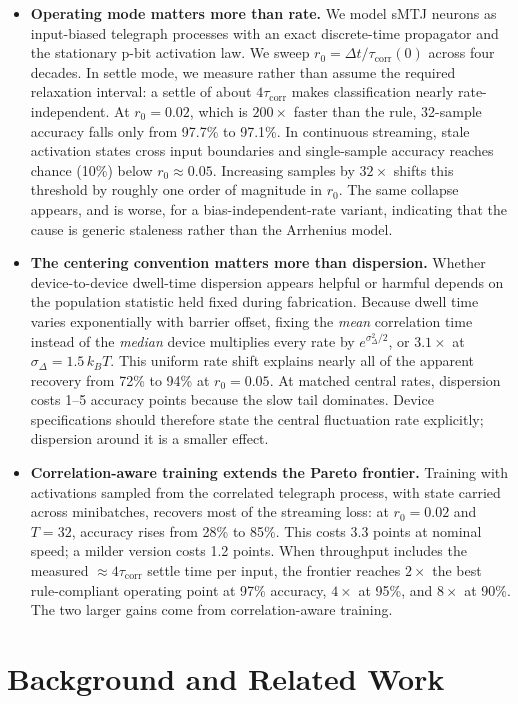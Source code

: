 \documentclass[journal]{IEEEtran}
\newcommand{\rzero}{r_0}
\newcommand{\tauc}{\tau_{\mathrm{corr}}}
\begin{document}
\begin{itemize}
\item \textbf{Operating mode matters more than rate.} We model sMTJ
neurons as input-biased telegraph processes with an exact discrete-time
propagator and the stationary p-bit activation law. We sweep
$\rzero=\Delta t/\tauc(0)$ across four decades. In settle mode, we measure
rather than assume the required relaxation interval: a settle of about
$4\tauc$ makes classification nearly rate-independent. At $\rzero=0.02$,
which is $200\times$ faster than the rule, 32-sample accuracy falls only
from 97.7\% to 97.1\%. In continuous streaming, stale activation states
cross input boundaries and single-sample accuracy reaches chance (10\%)
below $\rzero\approx0.05$. Increasing samples by $32\times$ shifts this
threshold by roughly one order of magnitude in $\rzero$. The same collapse
appears, and is worse, for a bias-independent-rate variant, indicating that
the cause is generic staleness rather than the Arrhenius model.
\item \textbf{The centering convention matters more than dispersion.}
Whether device-to-device dwell-time dispersion appears helpful or harmful
depends on the population statistic held fixed during fabrication. Because
dwell time varies exponentially with barrier offset, fixing the \emph{mean}
correlation time instead of the \emph{median} device multiplies every rate
by $e^{\sigma_\Delta^2/2}$, or $3.1\times$ at
$\sigma_\Delta=1.5\,k_BT$. This uniform rate shift explains nearly all of
the apparent recovery from 72\% to 94\% at $\rzero=0.05$. At matched
central rates, dispersion costs 1--5 accuracy points because the slow tail
dominates. Device specifications should therefore state the central
fluctuation rate explicitly; dispersion around it is a smaller effect.
\item \textbf{Correlation-aware training extends the Pareto frontier.}
Training with activations sampled from the correlated telegraph process,
with state carried across minibatches, recovers most of the streaming loss:
at $\rzero=0.02$ and $T{=}32$, accuracy rises from 28\% to 85\%. This
costs 3.3 points at nominal speed; a milder version costs 1.2 points. When
throughput includes the measured $\approx4\tauc$ settle time per input,
the frontier reaches $2\times$ the best rule-compliant operating point at
97\% accuracy, $4\times$ at 95\%, and $8\times$ at 90\%. The two larger
gains come from correlation-aware training.
\end{itemize}

\section{Background and Related Work}
\label{sec:related}
\end{document}
